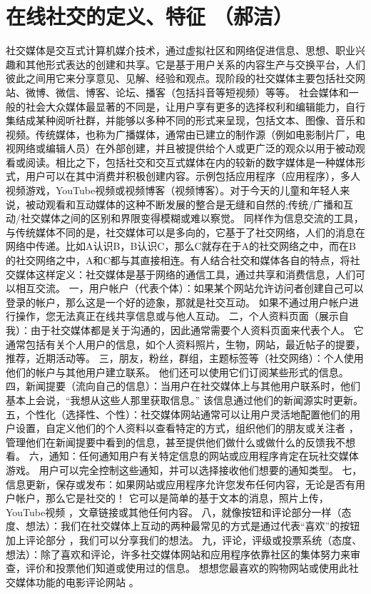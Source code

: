 \section{在线社交的定义、特征 %
（郝洁）%
}
社交媒体是交互式计算机媒介技术，通过虚拟社区和网络促进信息、思想、职业兴趣和其他形式表达的创建和共享。它是基于用户关系的内容生产与交换平台，人们彼此之间用它来分享意见、见解、经验和观点。现阶段的社交媒体主要包括社交网站、微博、微信、博客、论坛、播客（包括抖音等短视频）等等。
社会媒体和一般的社会大众媒体最显著的不同是，让用户享有更多的选择权利和编辑能力，自行集结成某种阅听社群，并能够以多种不同的形式来呈现，包括文本、图像、音乐和视频。传统媒体，也称为广播媒体，通常由已建立的制作源（例如电影制片厂，电视网络或编辑人员）在外部创建，并且被提供给个人或更广泛的观众以用于被动观看或阅读。相比之下，包括社交和交互式媒体在内的较新的数字媒体是一种媒体形式，用户可以在其中消费并积极创建内容。示例包括应用程序（应用程序），多人视频游戏，YouTube视频或视频博客（视频博客）。对于今天的儿童和年轻人来说，被动观看和互动媒体的这种不断发展的整合是无缝和自然的;传统/广播和互动/社交媒体之间的区别和界限变得模糊或难以察觉。
同样作为信息交流的工具，与传统媒体不同的是，社交媒体可以是多向的，它基于了社交网络，人们的消息在网络中传递。比如A认识B，B认识C，那么C就存在于A的社交网络之中，而在B的社交网络之中，A和C都与其直接相连。有人结合社交和媒体各自的特点，将社交媒体这样定义：社交媒体是基于网络的通信工具，通过共享和消费信息，人们可以相互交流。
一，用户帐户（代表个体）：如果某个网站允许访问者创建自己可以登录的帐户，那么这是一个好的迹象，那就是社交互动。 如果不通过用户帐户进行操作，您无法真正在线共享信息或与他人互动。
二，个人资料页面（展示自我）：由于社交媒体都是关于沟通的，因此通常需要个人资料页面来代表个人。 它通常包括有关个人用户的信息，如个人资料照片，生物，网站，最近帖子的提要，推荐，近期活动等。
三，朋友，粉丝，群组，主题标签等（社交网络）：个人使用他们的帐户与其他用户建立联系。 他们还可以使用它们订阅某些形式的信息。
四，新闻提要（流向自己的信息）：当用户在社交媒体上与其他用户联系时，他们基本上会说，“我想从这些人那里获取信息。” 该信息通过他们的新闻源实时更新。
五，个性化（选择性、个性）：社交媒体网站通常可以让用户灵活地配置他们的用户设置，自定义他们的个人资料以查看特定的方式，组织他们的朋友或关注者 ，管理他们在新闻提要中看到的信息，甚至提供他们做什么或做什么的反馈我不想看。
六，通知：任何通知用户有关特定信息的网站或应用程序肯定在玩社交媒体游戏。 用户可以完全控制这些通知，并可以选择接收他们想要的通知类型。
七，信息更新，保存或发布：如果网站或应用程序允许您发布任何内容，无论是否有用户帐户，那么它是社交的！ 它可以是简单的基于文本的消息，照片上传， YouTube视频 ，文章链接或其他任何内容。
八，就像按钮和评论部分一样（态度、想法）：我们在社交媒体上互动的两种最常见的方式是通过代表“喜欢”的按钮加上评论部分 ，我们可以分享我们的想法。
九，评论，评级或投票系统（态度、想法）：除了喜欢和评论，许多社交媒体网站和应用程序依靠社区的集体努力来审查，评价和投票他们知道或使用过的信息。 想想您最喜欢的购物网站或使用此社交媒体功能的电影评论网站 。

